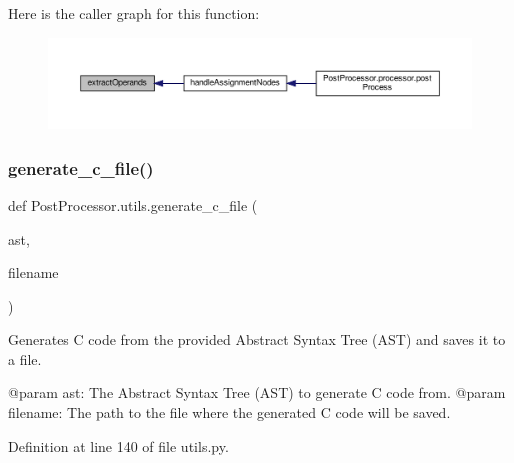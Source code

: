 Here is the caller graph for this function\+:\nopagebreak
\begin{figure}[H]
\begin{center}
\leavevmode
\includegraphics[width=350pt]{namespacePostProcessor_1_1utils_a756305ef1f9ed9b8a0f01428433e026e_icgraph}
\end{center}
\end{figure}
\mbox{\label{namespacePostProcessor_1_1utils_a998fb471074ff747973a0d974eb9fbd1}} 
\subsubsection{\texorpdfstring{generate\+\_\+c\+\_\+file()}{generate\_c\_file()}}
{\footnotesize\ttfamily def Post\+Processor.\+utils.\+generate\+\_\+c\+\_\+file (\begin{DoxyParamCaption}\item[{}]{ast,  }\item[{}]{filename }\end{DoxyParamCaption})}

\begin{DoxyVerb}Generates C code from the provided Abstract Syntax Tree (AST) and saves it to a file.

@param ast: The Abstract Syntax Tree (AST) to generate C code from.
@param filename: The path to the file where the generated C code will be saved.
\end{DoxyVerb}
 

Definition at line 140 of file utils.\+py.


